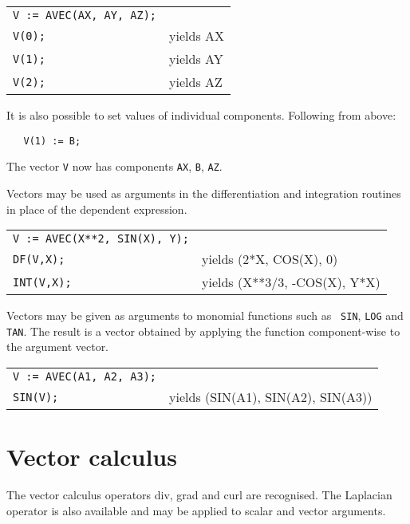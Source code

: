 \documentclass[11pt,letterpaper]{book}
\begin{document}
\begin{tabular}{l l}
{\tt V := AVEC(AX, AY, AZ);} & \\
{\tt V(0);} & yields AX \\
{\tt V(1);} & yields AY \\
{\tt V(2);} & yields AZ \\
\end{tabular}

It is also possible to set values of individual components. Following
from above:

{\small\begin{verbatim}
   V(1) := B;
\end{verbatim}}

The vector {\tt V} now has components {\tt AX}, {\tt B}, {\tt AZ}.

Vectors may be used as arguments in the differentiation and
integration routines in place of the dependent expression.

\begin{tabular}{l l}
{\tt V := AVEC(X**2, SIN(X), Y);} & \\
{\tt DF(V,X);} & yields (2*X, COS(X), 0) \\
{\tt INT(V,X);} & yields (X**3/3, -COS(X), Y*X) \\
\end{tabular}

Vectors may be given as arguments to monomial functions such as {\tt
SIN}, {\tt LOG} and {\tt TAN}. The result is a vector obtained by
applying the function component-wise to the argument vector.

\begin{tabular}{l l}
{\tt V := AVEC(A1, A2, A3);} & \\
{\tt SIN(V);} & yields (SIN(A1), SIN(A2), SIN(A3)) \\
\end{tabular}

\section{Vector calculus}

The vector calculus operators div, grad and curl are recognised.
The Laplacian operator is also available and may be applied to
scalar and vector arguments.
\end{document}
